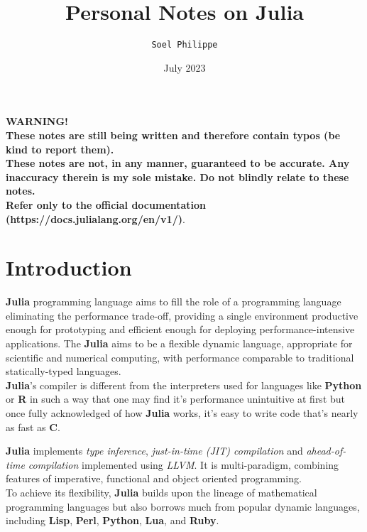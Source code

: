 \documentclass[
]{article}
\title{Personal Notes on \textbf{Julia}}
\author{\texttt{Soel Philippe}}
\date{July 2023}
\begin{document}
\maketitle
\tableofcontents
\newpage
\begin{minipage}[c][7cm][t]{\textwidth}
\vspace*{\fill}
\centering
{\Huge \textbf{WARNING!}}\\
\textbf{These notes are still being written and therefore contain typos (be kind to report them).\\
These notes are not, in any manner, guaranteed to be accurate. Any inaccuracy therein is my
sole mistake. Do not blindly relate to these notes.\\
Refer only to the official documentation (https://docs.julialang.org/en/v1/)}.
\vspace*{\fill}
\end{minipage}
\newpage
\hypertarget{introduction}{%
\section{Introduction}\label{introduction}}

\textbf{Julia} programming language aims to fill the role of a
programming language eliminating the performance trade-off, providing a
single environment productive enough for prototyping and efficient
enough for deploying performance-intensive applications. The
\textbf{Julia} aims to be a flexible dynamic language, appropriate for
scientific and numerical computing, with performance comparable to
traditional statically-typed languages.\\
\textbf{Julia}'s compiler is different from the interpreters used for
languages like \textbf{Python} or \textbf{R} in such a way that one may
find it's performance unintuitive at first but once fully acknowledged
of how \textbf{Julia} works, it's easy to write code that's nearly as
fast as \textbf{C}.

\textbf{Julia} implements \emph{type inference}, \emph{just-in-time
(JIT) compilation} and \emph{ahead-of-time compilation} implemented
using \emph{LLVM}. It is multi-paradigm, combining features of
imperative, functional and object oriented programming.\\
To achieve its flexibility, \textbf{Julia} builds upon the lineage of
mathematical programming languages but also borrows much from popular
dynamic languages, including \textbf{Lisp}, \textbf{Perl},
\textbf{Python}, \textbf{Lua}, and \textbf{Ruby}.
\end{document}
